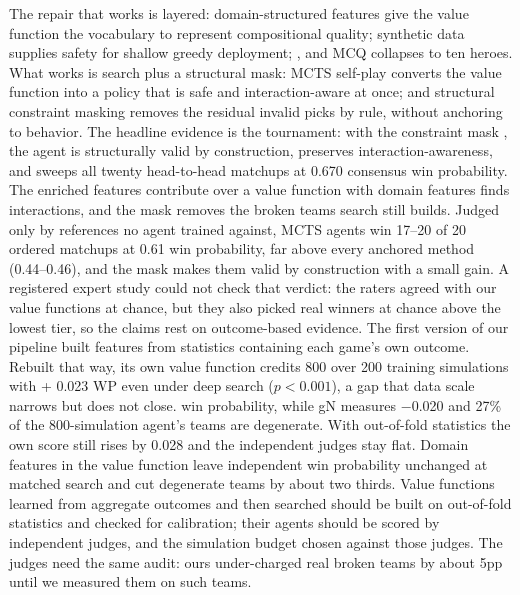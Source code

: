 \documentclass[journal]{IEEEtran}
\providecommand{\DIFaddtex}[1]{{\protect\color{blue} \sf #1}} %
\providecommand{\DIFdeltex}[1]{{\protect\color{red} \scriptsize #1}} %
\providecommand{\DIFaddbegin}{} %
\providecommand{\DIFaddend}{} %
\providecommand{\DIFdelbegin}{} %
\providecommand{\DIFdelend}{} %
\providecommand{\DIFadd}[1]{\texorpdfstring{\DIFaddtex{#1}}{#1}} %
\providecommand{\DIFdel}[1]{\texorpdfstring{\DIFdeltex{#1}}{}} %
\begin{document}
\DIFdel{The repair that works is layered: domain-structured features give the value function the vocabulary to represent compositional quality; synthetic data supplies safety for shallow greedy deployment; }\DIFdelend \DIFaddbegin \DIFadd{, and MCQ collapses to ten heroes. What works is search plus a structural mask: }\DIFaddend MCTS self-play \DIFdelbegin \DIFdel{converts the value function into a policy that is safe and interaction-aware at once; and structural constraint masking removes the residual invalid picks by rule, without anchoring to behavior. The headline evidence is the tournament: with the constraint mask , the agent is structurally valid by construction, preserves interaction-awareness, and sweeps all twenty head-to-head matchups at 0.670 consensus win probability. The enriched features contribute }\DIFdelend \DIFaddbegin \DIFadd{over a value function with domain features finds interactions, and the mask removes the broken teams search still builds. Judged only by references no agent trained against, MCTS agents win 17--20 of 20 ordered matchups at 0.61 win probability, far above every anchored method (0.44--0.46), and the mask makes them valid by construction with a small gain. A registered expert study could not check that verdict: the raters agreed with our value functions at chance, but they also picked real winners at chance above the lowest tier, so the claims rest on outcome-based evidence. The first version of our pipeline built features from statistics containing each game's own outcome. Rebuilt that way, its own value function credits 800 over 200 training simulations with }\DIFaddend +\DIFdelbegin \DIFdel{0.023 WP even under deep search ($p < 0.001$), a gap that data scale narrows but does not close. }\DIFdelend \DIFaddbegin \DIFadd{0.068 win probability, while gN measures $-$0.020 and 27\% of the 800-simulation agent's teams are degenerate. With out-of-fold statistics the own score still rises by 0.028 and the independent judges stay flat. Domain features in the value function leave independent win probability unchanged at matched search and cut degenerate teams by about two thirds. Value functions learned from aggregate outcomes and then searched should be built on out-of-fold statistics and checked for calibration; their agents should be scored by independent judges, and the simulation budget chosen against those judges. The judges need the same audit: ours under-charged real broken teams by about 5pp until we measured them on such teams.
}\DIFaddend 
\end{document}
